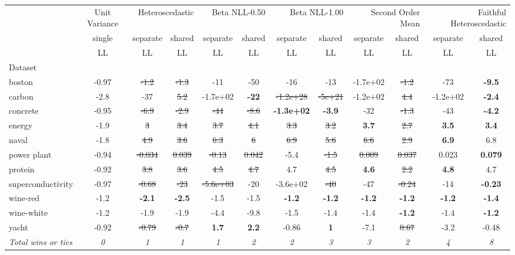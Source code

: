 \begin{tabular}{l|c|cc|cc|cc|cc|cc}
\toprule
{} & {Unit Variance} & \multicolumn{2}{r}{Heteroscedastic} & \multicolumn{2}{r}{Beta NLL-0.50} & \multicolumn{2}{r}{Beta NLL-1.00} & \multicolumn{2}{r}{Second Order Mean} & \multicolumn{2}{r}{Faithful Heteroscedastic} \\
{} & {single} & {separate} & {shared} & {separate} & {shared} & {separate} & {shared} & {separate} & {shared} & {separate} & {shared} \\
{} & {LL} & {LL} & {LL} & {LL} & {LL} & {LL} & {LL} & {LL} & {LL} & {LL} & {LL} \\
{Dataset} & {} & {} & {} & {} & {} & {} & {} & {} & {} & {} & {} \\
\midrule
boston & -0.97 & \sout{-1.2} & \sout{-1.3} & -11 & -50 & -16 & -13 & -1.7e+02 & \sout{-1.2} & -73 & \textbf{-9.5} \\
carbon & -2.8 & -37 & \sout{5.2} & -1.7e+02 & \textbf{-22} & \sout{-1.2e+28} & \sout{-5e+21} & -1.2e+02 & \sout{4.4} & -1.2e+02 & \textbf{-2.4} \\
concrete & -0.95 & \sout{-6.9} & \sout{-2.9} & \sout{-44} & \sout{-8.6} & \textbf{-1.3e+02} & \textbf{-3.9} & -32 & \sout{-1.3} & -43 & \textbf{-4.2} \\
energy & -1.9 & \sout{3} & \sout{3.4} & \sout{3.7} & \sout{4.1} & \sout{3.3} & \sout{3.2} & \textbf{3.7} & \sout{2.7} & \textbf{3.5} & \textbf{3.4} \\
naval & -1.8 & \sout{4.9} & \sout{3.6} & \sout{6.3} & \sout{6} & \sout{6.9} & \sout{5.6} & \sout{6.6} & \sout{2.9} & \textbf{6.9} & 6.8 \\
power plant & -0.94 & \sout{-0.034} & \sout{0.039} & \sout{-0.13} & \sout{0.042} & -5.4 & \sout{-1.5} & \sout{0.009} & \sout{0.037} & 0.023 & \textbf{0.079} \\
protein & -0.92 & \sout{3.8} & \sout{3.6} & \sout{4.5} & \sout{4.7} & 4.7 & \sout{4.5} & \textbf{4.6} & \sout{2.2} & \textbf{4.8} & 4.7 \\
superconductivity & -0.97 & \sout{-0.68} & \sout{-23} & \sout{-5.6e+03} & -20 & -3.6e+02 & \sout{-40} & -47 & \sout{-0.24} & -14 & \textbf{-0.23} \\
wine-red & -1.2 & \textbf{-2.1} & \textbf{-2.5} & -1.5 & -1.5 & \textbf{-1.2} & \textbf{-1.2} & \textbf{-1.2} & \textbf{-1.2} & \textbf{-1.2} & \textbf{-1.4} \\
wine-white & -1.2 & -1.9 & -1.9 & -4.4 & -9.8 & -1.5 & -1.4 & -1.4 & \textbf{-1.2} & -1.4 & \textbf{-1.2} \\
yacht & -0.92 & \sout{-0.79} & \sout{-0.7} & \textbf{1.7} & \textbf{2.2} & -0.86 & \textbf{1} & -7.1 & \sout{0.67} & -3.2 & -0.48 \\
\textit{{Total wins or ties}} & \textit{0} & \textit{1} & \textit{1} & \textit{1} & \textit{2} & \textit{2} & \textit{3} & \textit{3} & \textit{2} & \textit{4} & \textit{8} \\
\bottomrule
\end{tabular}
